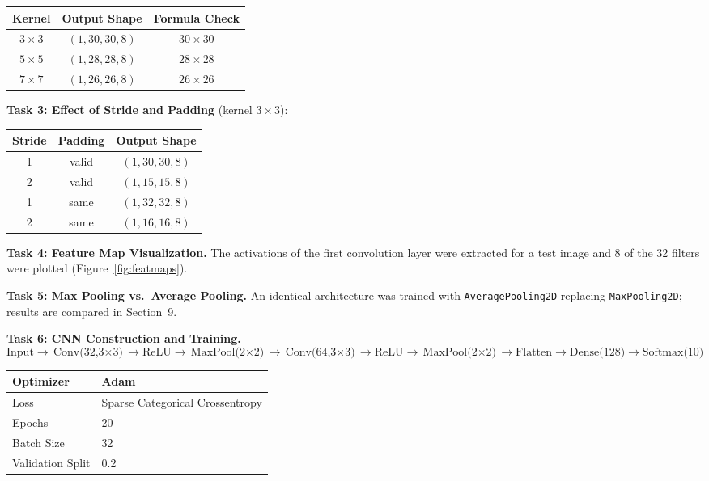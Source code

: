 \documentclass[11pt]{article}
\begin{document}
\begin{center}
\begin{tabular}{|c|c|c|}
\hline
Kernel & Output Shape & Formula Check \\ \hline
$3\times3$ & $(1,30,30,8)$ & $30\times30$ \\ \hline
$5\times5$ & $(1,28,28,8)$ & $28\times28$ \\ \hline
$7\times7$ & $(1,26,26,8)$ & $26\times26$ \\ \hline
\end{tabular}
\end{center}

\vspace{2mm}
\textbf{Task 3: Effect of Stride and Padding} (kernel $3\times3$):

\begin{center}
\begin{tabular}{|c|c|c|}
\hline
Stride & Padding & Output Shape \\ \hline
1 & valid & $(1,30,30,8)$ \\ \hline
2 & valid & $(1,15,15,8)$ \\ \hline
1 & same  & $(1,32,32,8)$ \\ \hline
2 & same  & $(1,16,16,8)$ \\ \hline
\end{tabular}
\end{center}

\vspace{2mm}
\textbf{Task 4: Feature Map Visualization.} The activations of the first convolution layer were extracted for a test image and 8 of the 32 filters were plotted (Figure~\ref{fig:featmaps}).

\vspace{2mm}
\textbf{Task 5: Max Pooling vs.\ Average Pooling.} An identical architecture was trained with \texttt{AveragePooling2D} replacing \texttt{MaxPooling2D}; results are compared in Section~9.

\vspace{2mm}
\textbf{Task 6: CNN Construction and Training.}
\[
\text{Input} \rightarrow \text{Conv(32,3$\times$3)} \rightarrow \text{ReLU} \rightarrow \text{MaxPool(2$\times$2)} \rightarrow \text{Conv(64,3$\times$3)} \rightarrow \text{ReLU} \rightarrow \text{MaxPool(2$\times$2)} \rightarrow \text{Flatten} \rightarrow \text{Dense(128)} \rightarrow \text{Softmax(10)}
\]

\begin{center}
\begin{tabular}{|l|l|}
\hline
Optimizer & Adam \\ \hline
Loss & Sparse Categorical Crossentropy \\ \hline
Epochs & 20 \\ \hline
Batch Size & 32 \\ \hline
Validation Split & 0.2 \\ \hline
\end{tabular}
\end{center}
\end{document}
